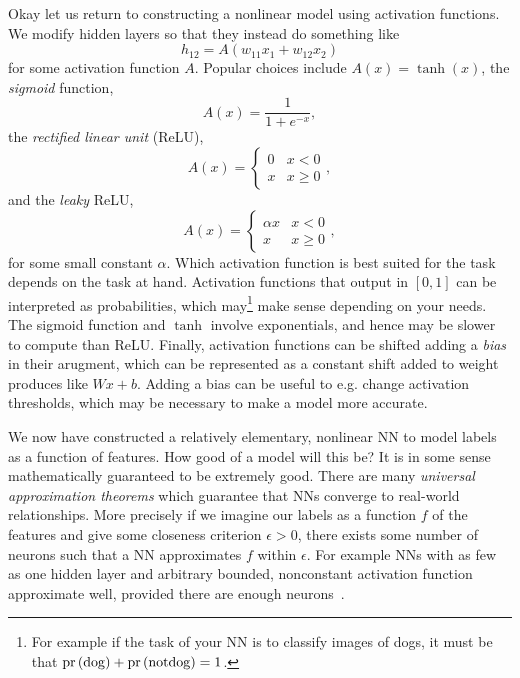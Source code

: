 Okay let us return to constructing a nonlinear model using activation functions.
We modify hidden layers so that they instead do something like
\begin{equation}
h_{12} = A\left(w_{11}x_1+w_{12}x_2\right)
\end{equation}
for some activation function $A$. Popular choices include
$A(x)=\tanh(x)$, the {\it sigmoid} function,
\begin{equation}
A(x)=\frac{1}{1+e^{-x}},
\end{equation}
the {\it rectified linear unit} (ReLU),
\begin{equation}
A(x)= \begin{cases}0 & x<0 \\ x & x \geq 0\end{cases},
\end{equation}
and the {\it leaky} ReLU, 
\begin{equation}
A(x)= \begin{cases}\alpha x & x<0 \\ x & x \geq 0\end{cases},
\end{equation}
for some small constant $\alpha$. Which activation function is best suited
for the task depends on the task at hand. Activation functions that output
in $[0,1]$ can be interpreted as probabilities, which may\footnote{For example
if the task of your NN is to classify images of dogs, it must be that
$\operatorname{pr}\left(\rm{dog}\right)+\operatorname{pr}\left(\rm{not dog}\right)=1$.} make sense
depending on your needs. The sigmoid function and $\tanh$ involve
exponentials, and hence may be slower to compute than ReLU. 
Finally, activation functions can be shifted adding a {\it bias}
in their arugment, which can be represented as a constant shift added
to weight produces like $Wx+b$. Adding a bias can be useful to e.g. change
activation thresholds, which may be necessary to make a model more accurate.

We now have constructed a relatively elementary, nonlinear NN to 
model labels as a function of features. How good of a model will this be?
It is in some sense mathematically guaranteed to be extremely good.
There are many {\it universal approximation theorems} which guarantee that NNs converge to real-world
relationships. More precisely if we imagine our labels as a function $f$ of the
features and give some closeness criterion $\epsilon>0$, there exists some
number of neurons such that a NN approximates $f$ within $\epsilon$.
For example NNs with as few as one hidden layer and arbitrary bounded,
nonconstant activation function approximate well, provided there
are enough neurons~\cite{hornik_approximation_1991}.

